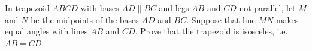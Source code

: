 In trapezoid $ABCD$ with bases $AD\parallel BC$ and legs $AB$ and $CD$ not parallel, let $M$ and $N$ be the midpoints of the bases $AD$ and $BC$. Suppose that line $MN$ makes equal angles with lines $AB$ and $CD$. Prove that the trapezoid is isosceles, i.e.\ $AB=CD$.
